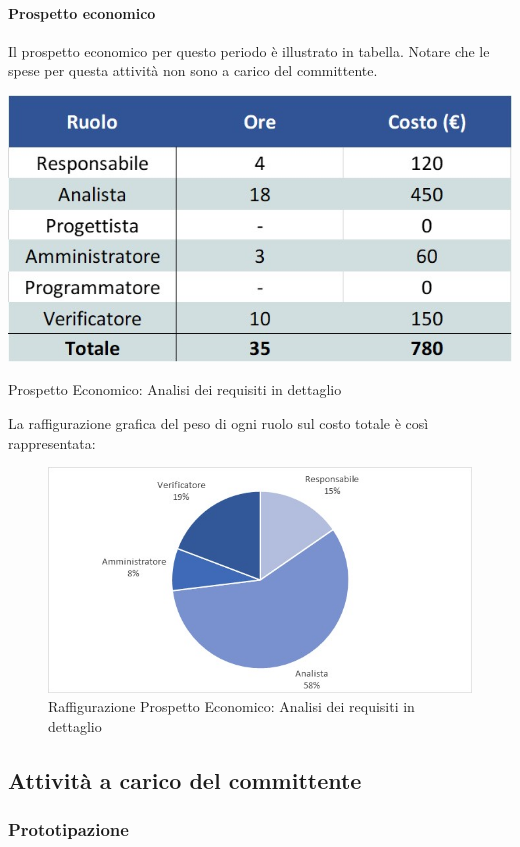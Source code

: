 \paragraph{Prospetto economico}
Il prospetto economico per questo periodo è illustrato in tabella. Notare che le spese per questa attività non sono a carico del committente.
\begin{table}[H]
	\centerline{\includegraphics[scale=0.7]{img/Preventivo/AnalisiRequisitiDettaglioEconomico.jpg}}
	\caption{Prospetto Economico: Analisi dei requisiti in dettaglio}
	\clearpage
\end{table}
La raffigurazione grafica del peso di ogni ruolo sul costo totale è così rappresentata: 
\begin{figure}[H]
	\centerline{\includegraphics[scale=0.9]{img/Preventivo/Torte/AnalisiRequisitiDettaglio.jpg}}
	\caption{Raffigurazione Prospetto Economico: Analisi dei requisiti in dettaglio}
	\clearpage
\end{figure}
\newpage
\subsection{Attività a carico del committente}
\subsubsection{Prototipazione}
